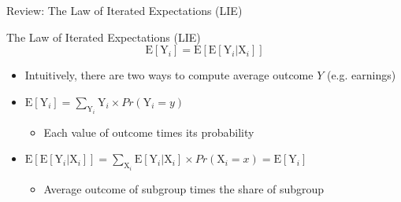 \documentclass[hyperref={pdfpagelabels=false}]{beamer}
\begin{document}
\begin{frame}{Review: The Law of Iterated Expectations (LIE)}
	
	\begin{block}{The Law of Iterated Expectations (LIE)}
		\begin{equation*}
		\mathrm{E}[\mathrm{Y}_{i}] = \mathrm{E}[\mathrm{E}[\mathrm{Y}_{i} | \mathrm{X}_{i}]]
		\end{equation*}
	\end{block}
	
	\begin{itemize}
		\item Intuitively, there are two ways to compute average outcome $Y$ (e.g. earnings)
		\vspace{0.2cm}
		\item[1] $\mathrm{E}[\mathrm{Y}_{i}] = \sum_{\mathrm{Y}^{}_{i}} \mathrm{Y}_{i} \times Pr(\mathrm{Y}_{i}=y)$
		\vspace{0.2cm}
			\begin{itemize}
		\item Each value of outcome times its probability
					\vspace{0.2cm}
			\end{itemize}
		\item[2] $\mathrm{E}[\mathrm{E}[\mathrm{Y}_{i} | \mathrm{X}_{i}]] = \sum_{\mathrm{X}^{}_{i}} \mathrm{E}[\mathrm{Y}_{i} | \mathrm{X}_{i}] \times Pr(\mathrm{X}_{i}=x) = \mathrm{E}[\mathrm{Y}_{i}]$ 
			\begin{itemize}
							\vspace{0.2cm}
			\item Average outcome of subgroup times the share of subgroup
		\end{itemize}
		
	\end{itemize}
\end{frame}
\end{document}
